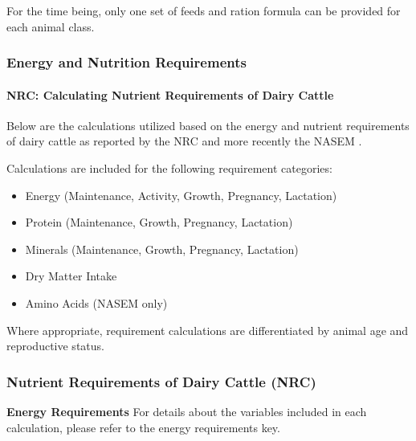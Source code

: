 \begin{refsection}
\begin{tcolorbox}[colback=white, colframe=black, title=Important Note]
For the time being, only one set of feeds and ration formula can be provided for each animal class. 
\end{tcolorbox}







\subsubsection{Energy and Nutrition Requirements}

\paragraph{NRC: Calculating Nutrient Requirements of Dairy Cattle} 

Below are the calculations utilized based on the energy and nutrient requirements of dairy cattle as reported by the NRC and more recently the NASEM \parencite{nrc2001, nrc2021}.
\vspace{0.2cm}

Calculations are included for the following requirement categories:
\begin{itemize}
    \item Energy (Maintenance, Activity, Growth, Pregnancy, Lactation)
    \item Protein (Maintenance, Growth, Pregnancy, Lactation)
    \item Minerals (Maintenance, Growth, Pregnancy, Lactation)
    \item Dry Matter Intake
    \item Amino Acids (NASEM only) 
\end{itemize}
\vspace{0.2cm}

Where appropriate, requirement calculations are differentiated by animal age and reproductive status.
\vspace{0.5cm}

\subsubsection{Nutrient Requirements of Dairy Cattle (NRC)} 

    \textbf{ Energy Requirements} For details about the variables included in each calculation, please refer to the energy requirements key.
    \vspace{0.2cm}
    

\end{refsection}
